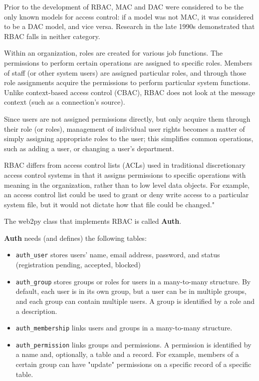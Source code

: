\documentclass[justified,sixbynine,notoc]{tufte-book}
\def\ft{\small\tt}
\begin{document}
\begin{fullwidth}
Prior to the development of RBAC, MAC and DAC were considered to be the only known models for access control: if a model was not MAC, it was considered to be a DAC model, and vice versa. Research in the late 1990s demonstrated that RBAC falls in neither category.

Within an organization, roles are created for various job functions. The permissions to perform certain operations are assigned to specific roles. Members of staff (or other system users) are assigned particular roles, and through those role assignments acquire the permissions to perform particular system functions. Unlike context-based access control (CBAC), RBAC does not look at the message context (such as a connection's source).

Since users are not assigned permissions directly, but only acquire them through their role (or roles), management of individual user rights becomes a matter of simply assigning appropriate roles to the user; this simplifies common operations, such as adding a user, or changing a user's department.

RBAC differs from access control lists (ACLs) used in traditional discretionary access control systems in that it assigns permissions to specific operations with meaning in the organization, rather than to low level data objects. For example, an access control list could be used to grant or deny write access to a particular system file, but it would not dictate how that file could be changed."

The web2py class that implements RBAC is called {\bf Auth}.

{\bf Auth} needs (and defines) the following tables:
\begin{itemize}
\item {\ft auth\_user} stores users' name, email address, password, and status (registration pending, accepted, blocked)

\item {\ft auth\_group} stores groups or roles for users in a many-to-many structure. By default, each user is in its own group, but a user can be in multiple groups, and each group can contain multiple users. A group is identified by a role and a description.

\item {\ft auth\_membership} links users and groups in a many-to-many structure.

\item {\ft auth\_permission} links groups and permissions. A permission is identified by a name and, optionally, a table and a record. For example, members of a certain group can have "update" permissions on a specific record of a specific table.


\end{itemize}
\end{fullwidth}
\end{document}
